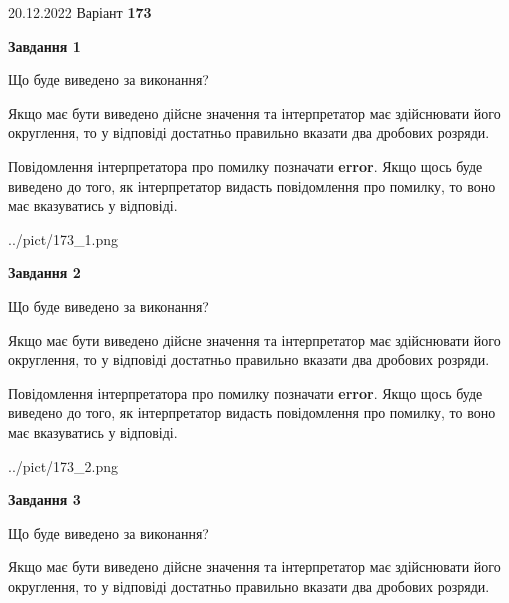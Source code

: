 \documentclass[12pt, ukrainian]{article}
\begin{document}
{20.12.2022 Варіант \No \textbf { 173 }\par}
{
\begin {Large}

{\begin {center}\textbf{Завдання 1}\end {center}}\par
Що буде виведено за виконання? \par

Якщо має бути виведено дійсне значення та інтерпретатор має здійснювати його округлення, 
то у відповіді достатньо правильно вказати два дробових розряди.

Повідомлення інтерпретатора про помилку позначати \textbf{error}.
Якщо щось буде виведено до того, як інтерпретатор видасть повідомлення про помилку, 
то воно має вказуватись у відповіді. \par

\begin{center}
	{../pict/173_1.png}
\end{center}
\newpage

{\begin {center}\textbf{Завдання 2}\end {center}}\par
Що буде виведено за виконання? \par

Якщо має бути виведено дійсне значення та інтерпретатор має здійснювати його округлення, 
то у відповіді достатньо правильно вказати два дробових розряди.

Повідомлення інтерпретатора про помилку позначати \textbf{error}.
Якщо щось буде виведено до того, як інтерпретатор видасть повідомлення про помилку, 
то воно має вказуватись у відповіді. \par

\begin{center}
	{../pict/173_2.png}
\end{center}
\newpage

{\begin {center}\textbf{Завдання 3}\end {center}}\par
Що буде виведено за виконання? \par

Якщо має бути виведено дійсне значення та інтерпретатор має здійснювати його округлення, 
то у відповіді достатньо правильно вказати два дробових розряди.


\end{Large}}
\end{document}

